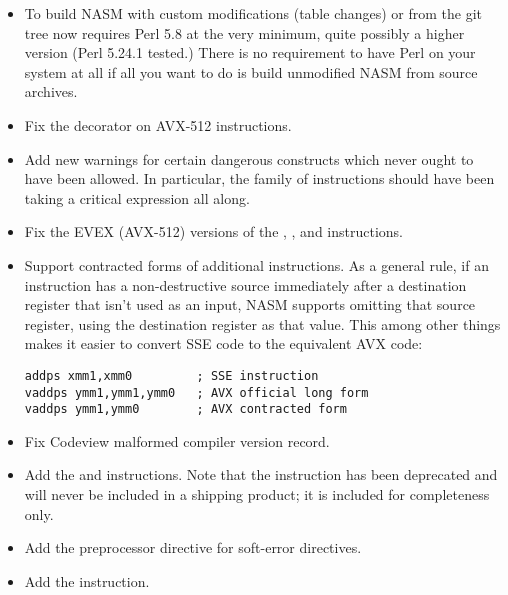 \begin{itemize}
    \item{To build NASM with custom modifications (table changes) or from the
        git tree now requires Perl 5.8 at the very minimum, quite possibly
        a higher version (Perl 5.24.1 tested.) There is no requirement to
        have Perl on your system at all if all you want to do is build
        unmodified NASM from source archives.}

    \item{Fix the  decorator on AVX-512 
        instructions.}

    \item{Add new warnings for certain dangerous constructs which never ought
        to have been allowed. In particular, the  family of
        instructions should have been taking a critical expression all
        along.}

    \item{Fix the EVEX (AVX-512) versions of the , ,
        and  instructions.}

    \item{Support contracted forms of additional instructions. As a general
        rule, if an instruction has a non-destructive source immediately
        after a destination register that isn't used as an input, NASM
        supports omitting that source register, using the destination
        register as that value. This among other things makes it easier to
        convert SSE code to the equivalent AVX code:
\begin{lstlisting}
addps xmm1,xmm0         ; SSE instruction
vaddps ymm1,ymm1,ymm0   ; AVX official long form
vaddps ymm1,ymm0        ; AVX contracted form
\end{lstlisting}}

    \item{Fix Codeview malformed compiler version record.}

    \item{Add the  and  instructions. Note that the
         instruction has been deprecated and will never be
        included in a shipping product; it is included for completeness
        only.}

    \item{Add the  preprocessor directive for
        soft-error directives.}

    \item{Add the  instruction.}
\end{itemize}

